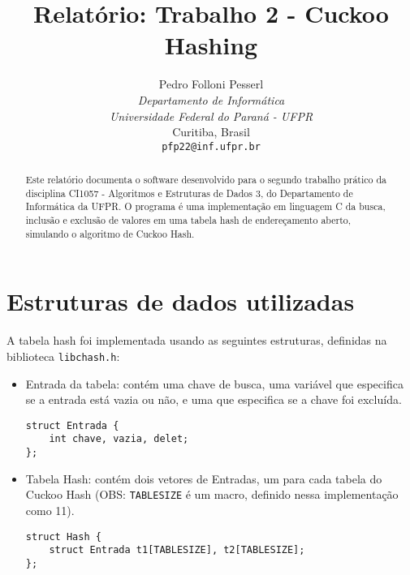 \documentclass[a4paper, 11pt]{article}
\title{Relatório: Trabalho 2 - Cuckoo Hashing}
\author{Pedro Folloni Pesserl\\
\textit{Departamento de Informática}\\
\textit{Universidade Federal do Paraná - UFPR}\\
Curitiba, Brasil\\
\texttt{pfp22@inf.ufpr.br}}
\date{}
\begin{document}
\maketitle

\begin{abstract}
\begin{singlespace}
Este relatório documenta o software desenvolvido para o segundo trabalho prático da
disciplina CI1057 - Algoritmos e Estruturas de Dados 3, do Departamento de Informática
da UFPR. O programa é uma implementação em linguagem C da busca, inclusão e exclusão
de valores em uma tabela hash de endereçamento aberto, simulando o algoritmo de
Cuckoo Hash.
\end{singlespace}
\end{abstract}

\section{Estruturas de dados utilizadas}
A tabela hash foi implementada usando as seguintes estruturas, definidas na biblioteca
\texttt{libchash.h}:
\begin{itemize}
    \item Entrada da tabela: contém uma chave de busca, uma variável que especifica se
        a entrada está vazia ou não, e uma que especifica se a chave foi excluída.
    \begin{verbatim}
struct Entrada {
    int chave, vazia, delet;
};
    \end{verbatim}

    \item Tabela Hash: contém dois vetores de Entradas, um para cada tabela do Cuckoo
        Hash (OBS: \texttt{TABLESIZE} é um macro, definido nessa implementação como 11).
    \begin{verbatim}
struct Hash {
    struct Entrada t1[TABLESIZE], t2[TABLESIZE];
};
    \end{verbatim}
\end{itemize}
\end{document}
